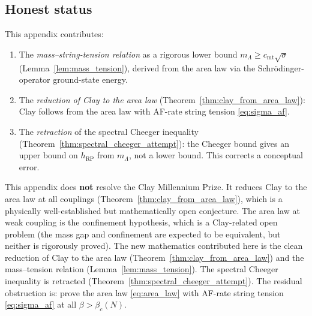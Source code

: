 \subsection{Honest status}
\label{ssec:spectral_cheeger_honest}

\begin{remark}
\label{rem:spectral_new}
This appendix contributes:
\begin{enumerate}
\item The \emph{mass--string-tension relation} as a rigorous lower
bound $m_{\Lambda}\ge c_{\mathrm{mt}}\sqrt{\sigma}$
(Lemma~\ref{lem:mass_tension}), derived from the area law via the
Schr\"{o}dinger-operator ground-state energy.
\item The \emph{reduction of Clay to the area law}
(Theorem~\ref{thm:clay_from_area_law}): Clay follows from the
area law with AF-rate string tension \eqref{eq:sigma_af}.
\item The \emph{retraction} of the spectral Cheeger inequality
(Theorem~\ref{thm:spectral_cheeger_attempt}): the Cheeger bound
gives an upper bound on $h_{\mathrm{RP}}$ from $m_{\Lambda}$, not
a lower bound. This corrects a conceptual error.
\end{enumerate}
\end{remark}

\begin{remark}
\label{rem:spectral_honest}
This appendix does \textbf{not} resolve the Clay Millennium Prize.
It reduces Clay to the area law at all couplings
(Theorem~\ref{thm:clay_from_area_law}), which is a physically
well-established but mathematically open conjecture. The area law
at weak coupling is the confinement hypothesis, which is a
Clay-related open problem (the mass gap and confinement are
expected to be equivalent, but neither is rigorously proved). The
new mathematics contributed here is the clean reduction of Clay to
the area law (Theorem~\ref{thm:clay_from_area_law}) and the
mass--tension relation (Lemma~\ref{lem:mass_tension}). The
spectral Cheeger inequality is retracted
(Theorem~\ref{thm:spectral_cheeger_attempt}). The residual
obstruction is: prove the area law \eqref{eq:area_law} with
AF-rate string tension \eqref{eq:sigma_af} at all
$\beta>\beta_{c}(N)$.
\end{remark}

